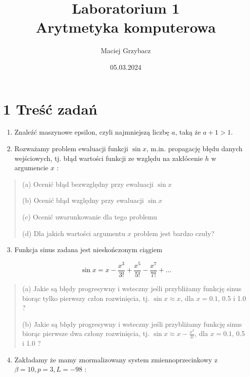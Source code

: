 \documentclass[10pt]{article}
\title{Laboratorium 1 \\
 Arytmetyka komputerowa}
\author{Maciej Grzybacz}
\date{05.03.2024}
\begin{document}
\maketitle

\section*{1 Treść zadań}
\begin{enumerate}
  \item Znaleźć maszynowe epsilon, czyli najmniejszą liczbę $a$, taką że $a+1>1$.

  \item Rozważamy problem ewaluacji funkcji $\sin x$, m.in. propagację błędu danych wejściowych, tj. błąd wartości funkcji ze względu na zakłócenie $h$ w argumencie $x$ :

\end{enumerate}

\begin{quote}
(a) Ocenić błąd bezwzględny przy ewaluacji $\sin x$

(b) Ocenić błąd względny przy ewaluacji $\sin x$

(c) Ocenić uwarunkowanie dla tego problemu

(d) Dla jakich wartości argumentu $x$ problem jest bardzo czuły?

\end{quote}
\begin{enumerate}
  \setcounter{enumi}{2}
  \item Funkcja sinus zadana jest nieskończonym ciągiem
\end{enumerate}

$$
\sin x=x-\frac{x^{3}}{3 !}+\frac{x^{5}}{5 !}-\frac{x^{7}}{7 !}+\ldots
$$

\begin{quote}
(a) Jakie są błędy progresywny i wsteczny jeśli przybliżamy funkcję sinus biorąc tylko pierwszy człon rozwinięcia, tj. $\sin x \approx x$, dla $x=0.1$, 0.5 i 1.0 ?

(b) Jakie są błędy progresywny i wsteczny jeśli przybliżamy funkcję sinus biorąc pierwsze dwa człony rozwinięcia, tj. $\sin x \approx x-\frac{x^{3}}{3 !}$, dla $x=0.1$, 0.5 i 1.0 ?
\end{quote}
\begin{enumerate}
  \setcounter{enumi}{3}
  \item Zakładamy że mamy znormalizowany system zmiennoprzecinkowy z $\beta=10, p=3, L=-98$ :
\end{enumerate}
\end{document}
